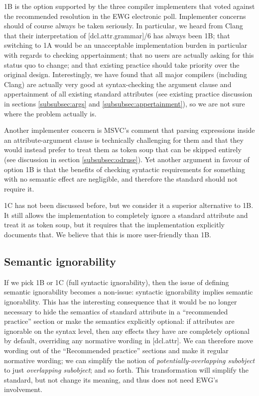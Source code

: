 1B is the option supported by the three compiler implementers that voted against the recommended resolution in the EWG electronic poll. Implementer concerns should of course always be taken seriously. In particular, we heard from Clang that their interpretation of [dcl.attr.grammar]/6 has always been 1B; that switching to 1A would be an unacceptable implementation burden in particular with regards to checking  appertainment;  that no users are actually asking for this status quo to change; and that existing practice should take priority over the original design. Interestingly, we have found that all major compilers (including Clang) are actually very good at syntax-checking the argument clause and appertainment of all existing standard attributes (see existing practice discussion in sections \ref{subsubsec:args} and \ref{subsubsec:appertainment}), so we are not sure where the problem actually is.

Another implementer concern is MSVC's comment that parsing expressions inside an attribute-argument clause is technically challenging for them and that they would instead prefer to treat them as token soup that can be skipped entirely (see discussion in section \ref{subsubsec:odruse}). Yet another argument in favour of option 1B is that the benefits of checking syntactic requirements for something with no semantic effect are negligible, and therefore the standard should not require it.

1C has not been discussed before, but we consider it a superior alternative to 1B. It still allows the implementation to completely ignore a standard attribute and treat it as token soup, but it requires that the implementation explicitly documents that. We believe that this is more user-friendly than 1B.

\subsection{Semantic ignorability}

If we pick 1B or 1C (full syntactic ignorability), then the issue of defining semantic ignorability becomes a non-issue: syntactic ignorability implies semantic ignorability. This has the interesting consequence that it would be no longer necessary to hide the semantics of standard attribute in a ``recommended practice'' section or make the semantics explicitly optional: if attributes are ignorable on the syntax level, then any effects they have are completely optional by default, overriding any normative wording in [dcl.attr]. We can therefore move wording out of the ``Recommended practice'' sections and make it regular normative wording; we can simplify the notion of \emph{potentially-overlapping subobject} to just \emph{overlapping subobject}; and so forth. This transformation will simplify the standard, but not change its meaning, and thus does not need EWG's involvement.


